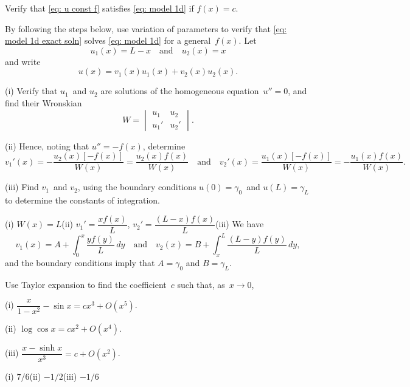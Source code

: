 \begin{example}
 
\end{example}

\begin{Exercises}

\exercise\label{ex: u const f}
Verify that \eqref{eq: u const f} satisfies \eqref{eq: model 1d} if $f(x)=c$.

\exercise\label{ex: variation of params}
By following the steps below, use variation of parameters to  verify that 
\eqref{eq: model 1d exact soln} solves \eqref{eq: model 1d} for a 
general~$f(x)$.  Let
\[
u_1(x)=L-x\quad\text{and}\quad u_2(x)=x
\]
and write
\[
u(x)=v_1(x)u_1(x)+v_2(x)u_2(x).
\]
\begin{description}
\item{(i)} Verify that $u_1$~and $u_2$ are solutions of the homogeneous 
equation~$u''=0$, and find their Wronskian
\[
W=\begin{vmatrix}u_1&u_2\\ u_1'&u_2' \end{vmatrix}.
\]
\item{(ii)} Hence, noting that $u''=-f(x)$, determine
\[
v_1'(x)=-\frac{u_2(x)[-f(x)]}{W(x)}=\frac{u_2(x)f(x)}{W(x)}
\quad\text{and}\quad
v_2'(x)=\frac{u_1(x)[-f(x)]}{W(x)}=-\frac{u_1(x)f(x)}{W(x)}.
\]
\item{(iii)}
Find $v_1$~and $v_2$, using the boundary conditions $u(0)=\gamma_0$~and 
$u(L)=\gamma_L$ to determine the constants of integration.
\end{description}
\begin{ans}
(i) $W(x)=L$\quad (ii) $v_1'=\dfrac{xf(x)}{L}$, 
$v_2'=\dfrac{(L-x)f(x)}{L}$\quad (iii) We have
\[
v_1(x)=A+\int_0^x\frac{yf(y)}{L}\,dy
\quad\text{and}\quad
v_2(x)=B+\int_x^L\frac{(L-y)f(y)}{L}\,dy,
\]
and the boundary conditions imply that $A=\gamma_0$ and $B=\gamma_L$.
\end{ans}

\exercise
Use Taylor expansion to find the coefficient~$c$ such that, as~$x\to0$,
\begin{description}
\item{(i)}
$\dfrac{x}{1-x^2}-\sin x=cx^3+O(x^5)$.
\item{(ii)}
$\log\cos x=cx^2+O(x^4)$.
\item{(iii)}
$\dfrac{x-\sinh x}{x^3}=c+O(x^2)$.
\end{description}
\begin{ans}
(i) $7/6$\quad (ii) $-1/2$\quad (iii) $-1/6$
\end{ans}


\end{Exercises}

